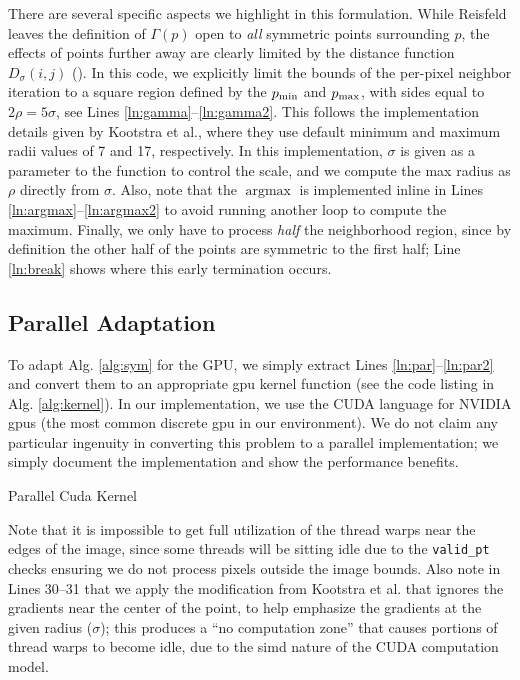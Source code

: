 \pagebreak
There are several specific aspects we highlight in this formulation. While Reisfeld leaves the definition of \(\Gamma(p)\) open to \emph{all} symmetric points surrounding \(p\), the effects of points further away are clearly limited by the distance function \(D_\sigma(i,j)\) (\ie {}). In this code, we explicitly limit the bounds of the per-pixel neighbor iteration to a square region defined by the \(p_{\min}\) and \(p_{\max}\), with sides equal to \(2\rho = 5\sigma\), see Lines \ref{ln:gamma}--\ref{ln:gamma2}. This follows the implementation details given by Kootstra et al.\cite{kootstra_using_2010}, where they use default minimum and maximum radii values of 7 and 17, respectively. In this implementation, \(\sigma\) is given as a parameter to the function to control the scale, and we compute the max radius as \(\rho\) directly from \(\sigma\). Also, note that the \(\operatorname{argmax}\) is implemented inline in Lines \ref{ln:argmax}--\ref{ln:argmax2} to avoid running another loop to compute the maximum. Finally, we only have to process \emph{half} the neighborhood region, since by definition the other half of the points are symmetric to the first half; Line \ref{ln:break} shows where this early termination occurs. 


\subsection{Parallel Adaptation}
\label{sec:parallel}

To adapt Alg. \ref{alg:sym} for the GPU, we simply extract Lines \ref{ln:par}--\ref{ln:par2} and convert them to an appropriate \gls{gpu} kernel function (see the code listing in Alg. \ref{alg:kernel}). In our implementation, we use the CUDA language for NVIDIA \glspl{gpu} (the most common discrete \gls{gpu} in our environment). We do not claim any particular ingenuity in converting this problem to a parallel implementation; we simply document the implementation and show the performance benefits. 

\Needspace{0.8\textheight}
\begin{algorithm}[!htp]
\caption{Parallel Cuda Kernel}\label{alg:kernel}

\end{algorithm}

Note that it is impossible to get full utilization of the thread warps near the edges of the image, since some threads will be sitting idle due to the \texttt{valid\_pt} checks ensuring we do not process pixels outside the image bounds. Also note in Lines 30--31 that we apply the modification from Kootstra et al.\cite{kootstra_using_2010} that ignores the gradients near the center of the point, to help emphasize the gradients at the given radius (\(\sigma\)); this produces a ``no computation zone'' that causes portions of thread warps to become idle, due to the \gls{simd} nature of the CUDA computation model.

